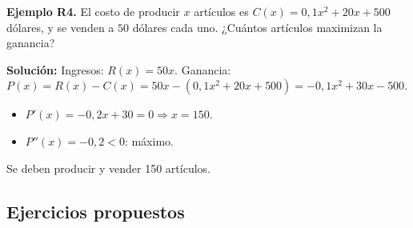 \documentclass[12pt, letterpaper]{article}
\begin{document}
\textbf{Ejemplo R4.} El costo de producir $x$ artículos es $C(x) = 0{,}1x^2 + 20x + 500$ dólares, y se venden a $50$ dólares cada uno. ¿Cuántos artículos maximizan la ganancia?

\begin{cuadrosolucion}
  \textbf{Solución:} Ingresos: $R(x) = 50x$. Ganancia: $P(x) = R(x) - C(x) = 50x - (0{,}1x^2 + 20x + 500) = -0{,}1x^2 + 30x - 500$.
  \begin{itemize}
    \item $P'(x) = -0{,}2x + 30 = 0 \Rightarrow x = 150$.
    \item $P''(x) = -0{,}2 < 0$: máximo.
  \end{itemize}
  Se deben producir y vender 150 artículos.
\end{cuadrosolucion}


\subsection{Ejercicios propuestos}
\end{document}

